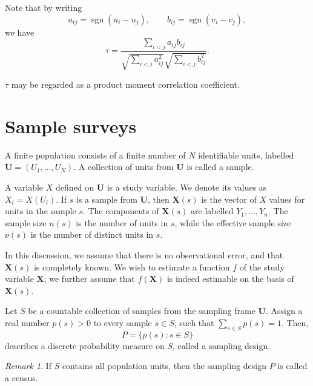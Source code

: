 \documentclass[11pt]{article}
\renewcommand{\vec}[1]{\bm{#1}}
\theoremstyle{definition}
\theoremstyle{remark}
\newtheorem*{remark}{Remark}
\numberwithin{equation}{section}
\begin{document}
    Note that by writing \[
        a_{ij} = \operatorname{sgn}(u_i - u_j), \qquad
        b_{ij} = \operatorname{sgn}(v_i - v_j),
    \] we have \[
        \tau = \frac{\sum_{i < j}a_{ij}b_{ij}}{\sqrt{\sum_{i < j} a_{ij}^2}
        \sqrt{\sum_{i < j} b_{ij}^2}}.
    \] 

    \begin{lemma}
        $\tau$ may be regarded as a product moment correlation coefficient.
    \end{lemma}
    



    \section{Sample surveys}

    \begin{definition}
        A finite population consists of a finite number of $N$ identifiable units,
        labelled $\vec{U} = (U_1, \dots, U_N)$.
        A collection of units from $\vec{U}$ is called a sample.
    \end{definition}

    \begin{definition}
        A variable $X$ defined on $\vec{U}$ is a study variable. We denote its values as
        $X_i = X(U_i)$.
        If $s$ is a sample from $\vec{U}$, then $\vec{X}(s)$ is the vector of $X$
        values for units in the sample $s$. The components of $\vec{X}(s)$ are
        labelled $Y_1, \dots, Y_n$.
        The sample size $n(s)$ is the number of units in $s$, while the effective
        sample size $\nu(s)$ is the number of distinct units in $s$.
    \end{definition}

    In this discussion, we assume that there is no observational error, and that
    $\vec{X}(s)$ is completely known. We wish to estimate a function $f$ of the study
    variable $\vec{X}$; we further assume that $f(\vec{X})$ is indeed estimable on
    the basis of $\vec{X}(s)$.

    \begin{definition}
        Let $S$ be a countable collection of samples from the sampling frame
        $\vec{U}$. Assign a real number $p(s) > 0$ to every sample $s \in S$, such that
        $\sum_{s \in S} p(s) = 1$. Then, \[
            P = \{p(s): s \in S\}
        \] describes a discrete probability measure on $S$, called a sampling design.
        \begin{remark}
            If $S$ contains all population units, then the sampling design $P$ is
            called a census.
        \end{remark}
    \end{definition}
\end{document}
